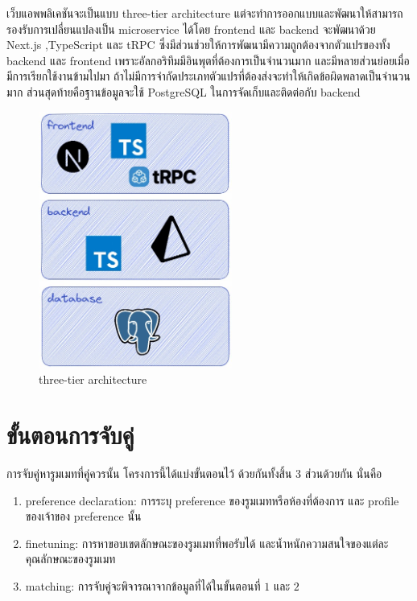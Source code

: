 เว็บแอพพลิเคชันจะเป็นแบบ three-tier architecture แต่จะทำการออกแบบและพัฒนาให้สามารถรองรับการเปลี่ยนแปลงเป็น microservice ได้โดย 
frontend และ backend จะพัฒนาด้วย Next.js ,TypeScript และ tRPC ซึ่งมีส่วนช่วยให้การพัฒนามีความถูกต้องจากตัวแปรของทั้ง backend และ 
frontend เพราะอัลกอริทึมมีอินพุตที่ต้องการเป็นจำนวนมาก และมีหลายส่วนย่อยเมื่อมีการเรียกใช้งานข้ามไปมา ถ้าไม่มีการจำกัดประเภทตัวแปรที่ต้องส่งจะทำให้เกิดข้อผิดพลาดเป็นจำนวนมาก
ส่วนสุดท้ายคือฐานข้อมูลจะใช้ PostgreSQL ในการจัดเก็บและติดต่อกับ backend


\begin{figure}[ht]
  \begin{center}
    \includegraphics[width=2.5in]{photo/diagram/app-arch.jpeg}
  \end{center}
  \caption{three-tier architecture}
  \label{fig:three-tier}
\end{figure}

\section{ขั้นตอนการจับคู่}
การจับคู่หารูมเมทที่คู่ควรนั้น โครงการนี้ได้แบ่งขั้นตอนไว้ ด้วยกันทั้งสิ้น 3 ส่วนด้วยกัน นั่นคือ
\begin{enumerate}
  \item preference declaration: การระบุ preference ของรูมเมทหรือห้องที่ต้องการ และ profile ของเจ้าของ preference นั้น 
  \item finetuning: การหาขอบเขตลักษณะของรูมเมทที่พอรับได้ และน้ำหนักความสนใจของแต่ละคุณลักษณะของรูมเมท
  \item matching: การจับคู่จะพิจารณาจากข้อมูลที่ได้ในขั้นตอนที่ $1$ และ $2$
\end{enumerate}

